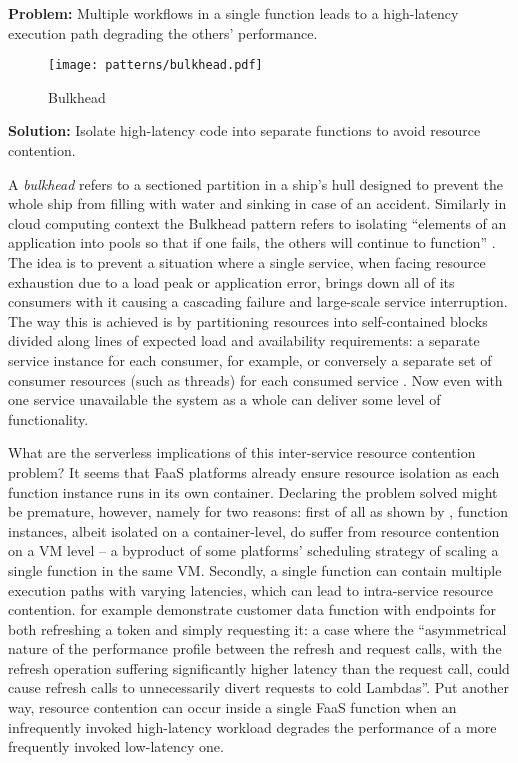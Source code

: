 \textbf{Problem:} Multiple workflows in a single function leads to a high-latency execution path degrading the others' performance.

\begin{figure}[h]
  \centering
  \texttt{[image: patterns/bulkhead.pdf]}
  \caption{Bulkhead}
  \label{fig:bulkhead}
\end{figure}

\textbf{Solution:} Isolate high-latency code into separate functions to avoid resource contention.

A \textit{bulkhead} refers to a sectioned partition in a ship's hull designed to prevent the whole ship from filling with water and sinking in case of an accident. Similarly in cloud computing context the Bulkhead pattern refers to isolating ``elements of an application into pools so that if one fails, the others will continue to function'' \parencite{microsoft18cloudPatterns}. The idea is to prevent a situation where a single service, when facing resource exhaustion due to a load peak or application error, brings down all of its consumers with it causing a cascading failure and large-scale service interruption. The way this is achieved is by partitioning resources into self-contained blocks divided along lines of expected load and availability requirements: a separate service instance for each consumer, for example, or conversely a separate set of consumer resources (such as threads) for each consumed service \parencite{nygard07releaseIt}. Now even with one service unavailable the system as a whole can deliver some level of functionality.

What are the serverless implications of this inter-service resource contention problem? It seems that FaaS platforms already ensure resource isolation as each function instance runs in its own container. Declaring the problem solved might be premature, however, namely for two reasons: first of all as shown by \textcite{wang18peekingbehindcurtains}, function instances, albeit isolated on a container-level, do suffer from resource contention on a VM level -- a byproduct of some platforms' scheduling strategy of scaling a single function in the same VM. Secondly, a single function can contain multiple execution paths with varying latencies, which can lead to intra-service resource contention. \textcite{bardsley18optimizationStrategies} for example demonstrate customer data function with endpoints for both refreshing a token and simply requesting it: a case
where the ``asymmetrical nature of the performance profile between the refresh and request calls, with the refresh operation suffering significantly higher latency than the request call, could cause refresh calls to unnecessarily divert requests to cold Lambdas''. Put another way, resource contention can occur inside a single FaaS function when an infrequently invoked high-latency workload degrades the performance of a more frequently invoked low-latency one.

